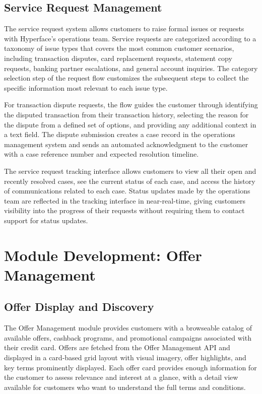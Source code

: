 \subsection{Service Request Management}

The service request system allows customers to raise formal issues or requests with Hyperface's operations team. Service requests are categorized according to a taxonomy of issue types that covers the most common customer scenarios, including transaction disputes, card replacement requests, statement copy requests, banking partner escalations, and general account inquiries. The category selection step of the request flow customizes the subsequent steps to collect the specific information most relevant to each issue type.

For transaction dispute requests, the flow guides the customer through identifying the disputed transaction from their transaction history, selecting the reason for the dispute from a defined set of options, and providing any additional context in a text field. The dispute submission creates a case record in the operations management system and sends an automated acknowledgment to the customer with a case reference number and expected resolution timeline.

The service request tracking interface allows customers to view all their open and recently resolved cases, see the current status of each case, and access the history of communications related to each case. Status updates made by the operations team are reflected in the tracking interface in near-real-time, giving customers visibility into the progress of their requests without requiring them to contact support for status updates.

\section{Module Development: Offer Management}

\subsection{Offer Display and Discovery}

The Offer Management module provides customers with a browseable catalog of available offers, cashback programs, and promotional campaigns associated with their credit card. Offers are fetched from the Offer Management API and displayed in a card-based grid layout with visual imagery, offer highlights, and key terms prominently displayed. Each offer card provides enough information for the customer to assess relevance and interest at a glance, with a detail view available for customers who want to understand the full terms and conditions.

